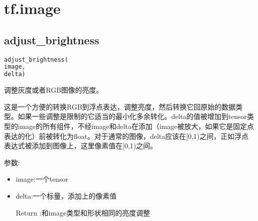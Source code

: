 \section{tf.image}
\subsection{adjust\_brightness}
\begin{lstlisting}[language=Python]
adjust_brightness(
image,
delta)
\end{lstlisting}
调整灰度或者RGB图像的亮度。

这是一个方便的转换RGB到浮点表达，调整亮度，然后转换它回原始的数据类型。如果一些调整是限制的它适当的最小化多余转化。delta的值被增加到tensor类型的image的所有组件，不经image和delta在添加（image被放大，如果它是固定点表达的化）前被转化为float。对于通常的图像，delta应该在[0,1)之间，正如浮点表达式被添加到图像上，这里像素值在[0,1)之间。

参数:
\begin{itemize}
		\item image:一个tensor
		\item delta:一个标量，添加上的像素值
		\item[Return]:和image类型和形状相同的亮度调整
\end{itemize}
